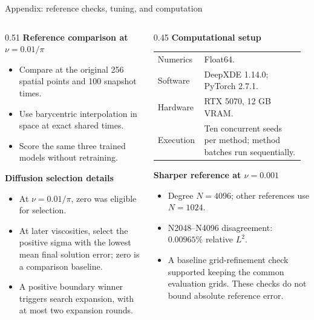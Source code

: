 \documentclass[aspectratio=169,11pt]{beamer}
\begin{document}
\begin{frame}[noframenumbering]{Appendix: reference checks, tuning, and computation}
  \footnotesize
  \begin{columns}[T,onlytextwidth]
    \begin{column}{0.51\textwidth}
      \textbf{Reference comparison at $\nu=0.01/\pi$}
      \begin{itemize}
        \item Compare at the original 256 spatial points and 100 snapshot times.
        \item Use barycentric interpolation in space at exact shared times.
        \item Score the same three trained models without retraining.
      \end{itemize}
      \medskip
      \textbf{Diffusion selection details}
      \begin{itemize}
        \item At $\nu=0.01/\pi$, zero was eligible for selection.
        \item At later viscosities, select the positive sigma with the lowest
          mean final solution error; zero is a comparison baseline.
        \item A positive boundary winner triggers search expansion,
          with at most two expansion rounds.
      \end{itemize}
    \end{column}
    \begin{column}{0.45\textwidth}
      \textbf{Computational setup}
      \par\smallskip
      \begin{tabular}{@{}p{0.27\linewidth}p{0.67\linewidth}@{}}
        \toprule
        Numerics & Float64. \\
        Software & DeepXDE 1.14.0; PyTorch 2.7.1. \\
        Hardware & RTX 5070, 12 GB VRAM. \\
        Execution & Ten concurrent seeds per method; method batches run
          sequentially. \\
        \bottomrule
      \end{tabular}
      \par\medskip
      \textbf{Sharper reference at $\nu=0.001$}
      \begin{itemize}
        \item Degree $N=4096$; other references use $N=1024$.
        \item N2048--N4096 disagreement: $0.00965\%$ relative $L^2$.
        \item A baseline grid-refinement check supported keeping the common
          evaluation grids. These checks do not bound absolute reference error.
      \end{itemize}
    \end{column}
  \end{columns}
\end{frame}
\end{document}
